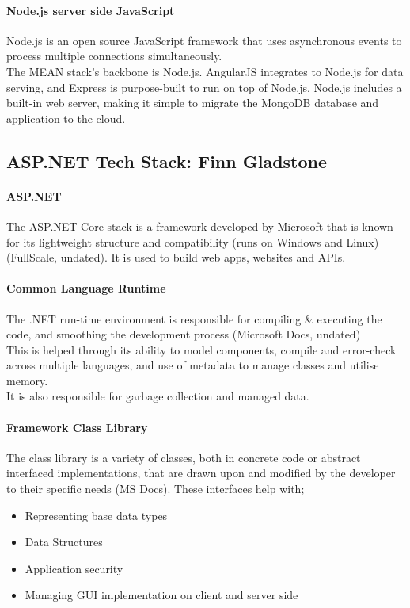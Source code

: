 \documentclass[a4paper, 11pt]{report}
\begin{document}
	\paragraph{Node.js server side JavaScript} Node.js is an open source JavaScript framework that uses asynchronous events to process multiple connections simultaneously.
	\\ The MEAN stack's backbone is Node.js. AngularJS integrates to Node.js for data serving, and Express is purpose-built to run on top of Node.js. Node.js includes a built-in web server, making it simple to migrate the MongoDB database and application to the cloud.
	
	
	\subsection{ASP.NET Tech Stack: Finn Gladstone}
	\paragraph{ASP.NET} The ASP.NET Core stack is a framework developed by Microsoft that is known for its lightweight structure and compatibility (runs on Windows and Linux) (FullScale, undated). It is used to build web apps, websites and APIs. 
	
	\paragraph{Common Language Runtime} The .NET run-time environment is responsible for compiling \& executing the code, and smoothing the development process (Microsoft Docs, undated)
	\\This is helped through its ability to model components, compile and error-check across multiple languages, and use of metadata to manage classes and utilise memory.  
	\\It is also responsible for garbage collection and managed data.
	
	\paragraph{Framework Class Library} The class library is a variety of classes, both in concrete code or abstract interfaced implementations, that are drawn upon and modified by the developer to their specific needs (MS Docs). These interfaces help with; 
	\begin{itemize}
		\item Representing base data types 
		\item Data Structures 
		\item Application security 
		\item Managing GUI implementation on client and server side
	\end{itemize}
	
\end{document}
